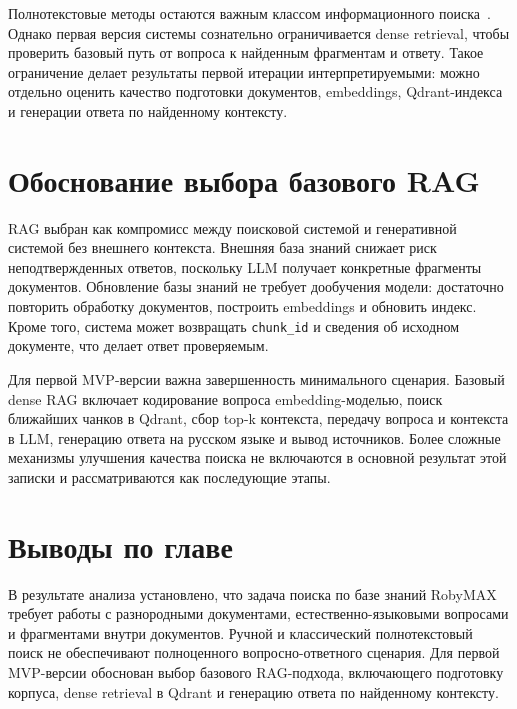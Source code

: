 Полнотекстовые методы остаются важным классом информационного поиска~\cite{Manning2008IR,Robertson2009BM25}. Однако первая версия системы сознательно ограничивается dense retrieval, чтобы проверить базовый путь от вопроса к найденным фрагментам и ответу. Такое ограничение делает результаты первой итерации интерпретируемыми: можно отдельно оценить качество подготовки документов, embeddings, Qdrant-индекса и генерации ответа по найденному контексту.

\section{Обоснование выбора базового RAG}

RAG выбран как компромисс между поисковой системой и генеративной системой без внешнего контекста. Внешняя база знаний снижает риск неподтвержденных ответов, поскольку LLM получает конкретные фрагменты документов. Обновление базы знаний не требует дообучения модели: достаточно повторить обработку документов, построить embeddings и обновить индекс. Кроме того, система может возвращать \texttt{chunk\_id} и сведения об исходном документе, что делает ответ проверяемым.

Для первой MVP-версии важна завершенность минимального сценария. Базовый dense RAG включает кодирование вопроса embedding-моделью, поиск ближайших чанков в Qdrant, сбор top-k контекста, передачу вопроса и контекста в LLM, генерацию ответа на русском языке и вывод источников. Более сложные механизмы улучшения качества поиска не включаются в основной результат этой записки и рассматриваются как последующие этапы.

\section{Выводы по главе}

В результате анализа установлено, что задача поиска по базе знаний RobyMAX требует работы с разнородными документами, естественно-языковыми вопросами и фрагментами внутри документов. Ручной и классический полнотекстовый поиск не обеспечивают полноценного вопросно-ответного сценария. Для первой MVP-версии обоснован выбор базового RAG-подхода, включающего подготовку корпуса, dense retrieval в Qdrant и генерацию ответа по найденному контексту.


